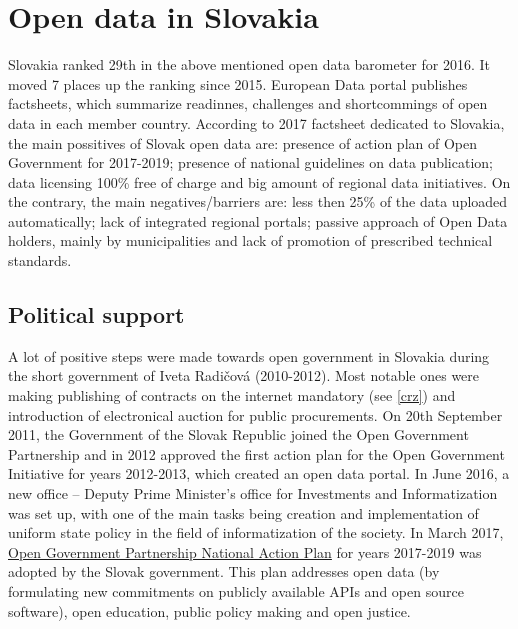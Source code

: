 \documentclass[thesis=B,english]{sprlajur-slovakopendata}[2018/05/12]
\begin{document}
\chapter{Open data in Slovakia}
\label{opendatainslovakia}
Slovakia ranked 29th in the above mentioned open data barometer for 2016. It moved 7 places up the ranking since 2015. European Data portal publishes factsheets, which summarize readinnes, challenges and shortcommings of open data in each member country. According to 2017 factsheet dedicated to Slovakia, the main possitives of Slovak open data are: presence of action plan of Open Government for 2017-2019; presence of national guidelines on data publication; data licensing 100\% free of charge and big amount of regional data initiatives. On the contrary, the main negatives/barriers are: less then 25\% of the data uploaded automatically; lack of integrated regional portals; passive approach of Open Data holders, mainly by municipalities and lack of promotion of prescribed technical standards. \cite{eudataportalfactsheet}
\section{Political support}
A lot of positive steps were made towards open government in Slovakia during the short government of Iveta Radičová (2010-2012). Most notable ones were making publishing of contracts on the internet mandatory (see \ref{crz}) and introduction of electronical auction for public procurements. On 20th September 2011, the Government of the Slovak Republic joined the Open Government Partnership and in 2012 approved the first  action plan for the Open Government Initiative for years 2012-2013, which created an open data portal. In June 2016, a new  office -- Deputy Prime Minister's office for Investments and Informatization was set up, with one of the main tasks being creation and implementation of uniform state policy in the field of informatization of the society. In March 2017, \href{https://www.opengovpartnership.org/sites/default/files/Slovakia_NAP_2017-2019_EN.pdf}{Open Government Partnership National Action Plan} for years 2017-2019 was adopted by the Slovak government. This plan addresses open data (by formulating new commitments on publicly available APIs and open source software), open education, public policy making and open justice.
\end{document}
